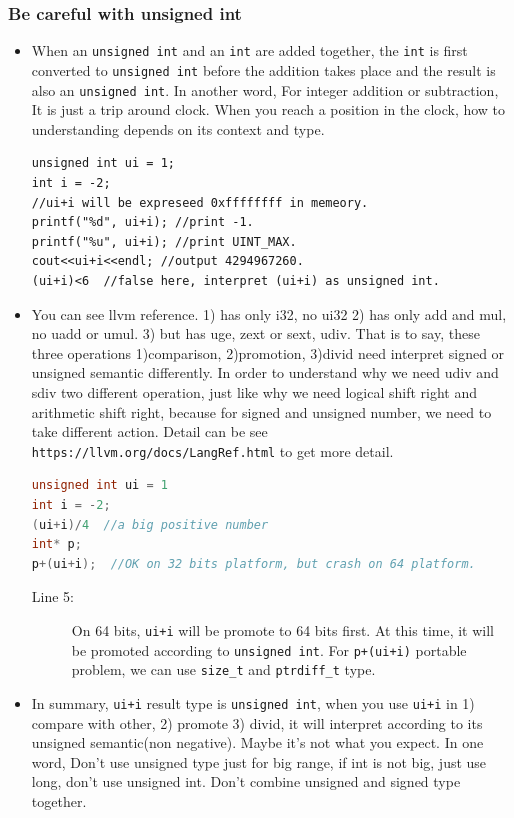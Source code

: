 \documentclass[a4paper,11pt,twoside]{book}
\begin{document}
\subsubsection{Be careful with unsigned int}
\begin{itemize}

    \item When an \texttt{unsigned int} and an \texttt{int} are added together, the \texttt{int} is first converted to \texttt{unsigned int} before the addition takes place and the result is also an \texttt{unsigned int}. In another word, For integer addition or subtraction, It is just a trip around clock. When you reach a position in the clock, how to understanding depends on its context and type.
\begin{lstlisting}[numbers=none]
unsigned int ui = 1;
int i = -2;
//ui+i will be expreseed 0xffffffff in memeory. 
printf("%d", ui+i); //print -1.
printf("%u", ui+i); //print UINT_MAX.	
cout<<ui+i<<endl; //output 4294967260.
(ui+i)<6  //false here, interpret (ui+i) as unsigned int.
\end{lstlisting}
    
	\item You can see llvm reference. 1) has only i32, no ui32 2) has only add and mul, no uadd or umul.  3) but has uge, zext or sext, udiv. That is to say, these three operations 1)comparison, 2)promotion, 3)divid  need interpret signed or unsigned semantic differently. In order to understand why we need udiv and sdiv two different operation, just like why we need logical shift right and arithmetic shift right, because for signed and unsigned number, we need to take different action. Detail can be see \verb|https://llvm.org/docs/LangRef.html| to get more detail.
	 
\begin{lstlisting}[frame=single, language=c++]
unsigned int ui = 1 
int i = -2;
(ui+i)/4  //a big positive number
int* p;
p+(ui+i);  //OK on 32 bits platform, but crash on 64 platform.
\end{lstlisting}

\begin{description}
	\item[Line 5:] On 64 bits, \texttt{ui+i} will be promote to 64 bits first. At this time, it will be promoted according to \texttt{unsigned int}. For \texttt{p+(ui+i)} portable problem, we can use \texttt{size\_t} and \texttt{ptrdiff\_t} type. 
\end{description}
	
    \item In summary, \texttt{ui+i} result type is \texttt{unsigned int},  when you use \texttt{ui+i} in 1) compare with other, 2) promote 3) divid, it will interpret according to its unsigned semantic(non negative). Maybe it's not what you expect.  In one word, Don't use unsigned type just for big range, if int is not big, just use long, don't use unsigned int. Don't combine unsigned and signed type together.
\end{itemize}
\end{document}
